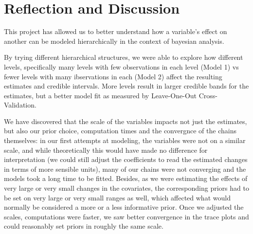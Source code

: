 \documentclass[12pt]{article}
\newcommand{\blue}[1]{\textcolor{blue}{#1}}
\begin{document}
\section{Reflection and Discussion}

This project has allowed us to better understand how a variable's effect on another can be modeled hierarchically in the context of bayesian analysis.


By trying different hierarchical structures, we were able to explore how different levels, specifically many levels with few observations in each level (Model 1) vs fewer levels with many ibservations in each (Model 2) affect the resulting estimates and credible intervals. More levels result in larger credible bands for the estimates, but a better model fit as measured by Leave-One-Out Cross-Validation. 

We have discovered that the scale of the variables impacts not just the estimates, but also our prior choice, computation times and the convergnce of the chains themselves: in our first attempts at modeling, the variables were not on a similar scale, and while theoretically this would have made no difference for interpretation (we could still adjust the coefficients to read the estimated changes in terms of more sensible units), many of our chains were not converging and the models took a long time to be fitted.
Besides, as we were estimating the effects of very large or very small changes in the covariates, the corresponding priors had to be set on very large or very small ranges as well, which affected what would normally be considered a more or a less informative prior. Once we adjusted the scales, computations were faster, we saw better convergence in the trace plots and could reasonably set priors in roughly the same scale.
\end{document}
